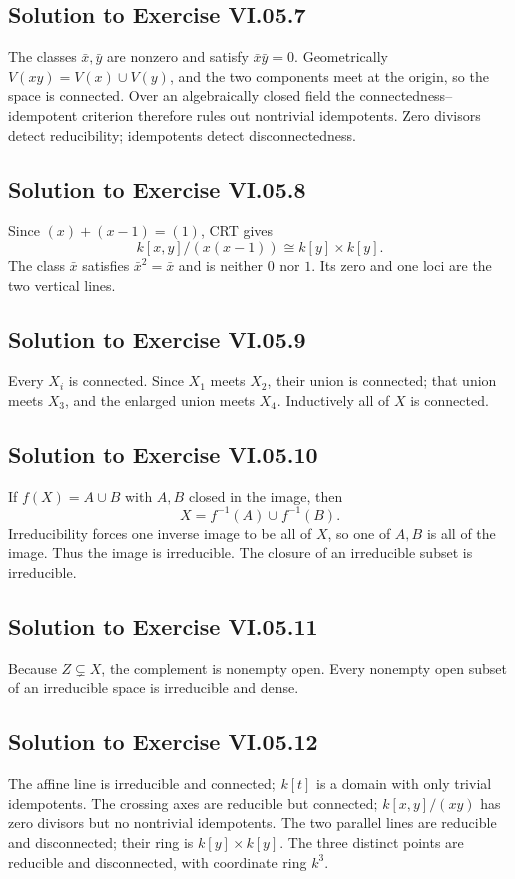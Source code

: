 \subsection*{Solution to Exercise VI.05.7}
The classes \(\bar x,\bar y\) are nonzero and satisfy \(\bar x\bar y=0\).  Geometrically
\(V(xy)=V(x)\cup V(y)\), and the two components meet at the origin, so the space is
connected.  Over an algebraically closed field the connectedness--idempotent criterion
therefore rules out nontrivial idempotents.  Zero divisors detect reducibility; idempotents
detect disconnectedness.

\subsection*{Solution to Exercise VI.05.8}
Since \((x)+(x-1)=(1)\), CRT gives
\[
k[x,y]/(x(x-1))\cong k[y]\times k[y].
\]
The class \(\bar x\) satisfies \(\bar x^2=\bar x\) and is neither \(0\) nor \(1\).  Its
zero and one loci are the two vertical lines.

\subsection*{Solution to Exercise VI.05.9}
Every \(X_i\) is connected.  Since \(X_1\) meets \(X_2\), their union is connected; that
union meets \(X_3\), and the enlarged union meets \(X_4\).  Inductively all of \(X\) is
connected.

\subsection*{Solution to Exercise VI.05.10}
If \(f(X)=A\cup B\) with \(A,B\) closed in the image, then
\[
X=f^{-1}(A)\cup f^{-1}(B).
\]
Irreducibility forces one inverse image to be all of \(X\), so one of \(A,B\) is all of
the image.  Thus the image is irreducible.  The closure of an irreducible subset is
irreducible.

\subsection*{Solution to Exercise VI.05.11}
Because \(Z\subsetneq X\), the complement is nonempty open.  Every nonempty open subset of
an irreducible space is irreducible and dense.

\subsection*{Solution to Exercise VI.05.12}
The affine line is irreducible and connected; \(k[t]\) is a domain with only trivial
idempotents.  The crossing axes are reducible but connected; \(k[x,y]/(xy)\) has zero
divisors but no nontrivial idempotents.  The two parallel lines are reducible and
disconnected; their ring is \(k[y]\times k[y]\).  The three distinct points are reducible
and disconnected, with coordinate ring \(k^3\).

